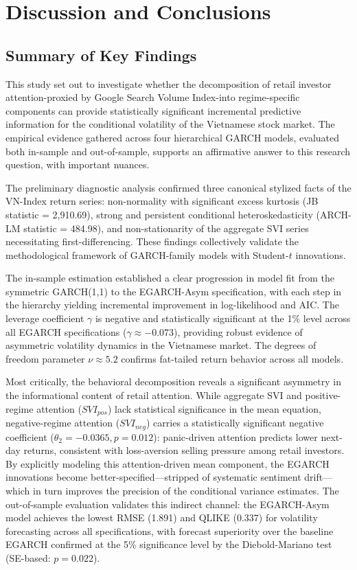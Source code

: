 \documentclass[12pt, a4paper]{article}
\begin{document}
\section{Discussion and Conclusions}

\subsection{Summary of Key Findings}

This study set out to investigate whether the decomposition of retail investor attention-proxied by Google Search Volume Index-into regime-specific components can provide statistically significant incremental predictive information for the conditional volatility of the Vietnamese stock market. The empirical evidence gathered across four hierarchical GARCH models, evaluated both in-sample and out-of-sample, supports an affirmative answer to this research question, with important nuances.

The preliminary diagnostic analysis confirmed three canonical stylized facts of the VN-Index return series: non-normality with significant excess kurtosis (JB statistic = 2,910.69), strong and persistent conditional heteroskedasticity (ARCH-LM statistic = 484.98), and non-stationarity of the aggregate SVI series necessitating first-differencing. These findings collectively validate the methodological framework of GARCH-family models with Student-$t$ innovations.

The in-sample estimation established a clear progression in model fit from the symmetric GARCH(1,1) to the EGARCH-Asym specification, with each step in the hierarchy yielding incremental improvement in log-likelihood and AIC. The leverage coefficient $\gamma$ is negative and statistically significant at the 1\% level across all EGARCH specifications ($\gamma \approx -0.073$), providing robust evidence of asymmetric volatility dynamics in the Vietnamese market. The degrees of freedom parameter $\nu \approx 5.2$ confirms fat-tailed return behavior across all models.

Most critically, the behavioral decomposition reveals a significant asymmetry in the informational content of retail attention. While aggregate SVI and positive-regime attention ($SVI_{pos}$) lack statistical significance in the mean equation, negative-regime attention ($SVI_{neg}$) carries a statistically significant negative coefficient ($\theta_2 = -0.0365, p = 0.012$): panic-driven attention predicts lower next-day returns, consistent with loss-aversion selling pressure among retail investors. By explicitly modeling this attention-driven mean component, the EGARCH innovations become better-specified—stripped of systematic sentiment drift—which in turn improves the precision of the conditional variance estimates. The out-of-sample evaluation validates this indirect channel: the EGARCH-Asym model achieves the lowest RMSE (1.891) and QLIKE (0.337) for volatility forecasting across all specifications, with forecast superiority over the baseline EGARCH confirmed at the 5\% significance level by the Diebold-Mariano test (SE-based: $p = 0.022$).
\end{document}
